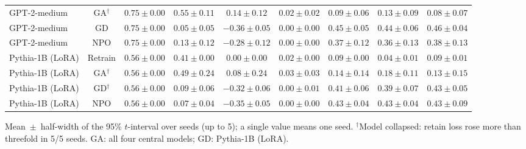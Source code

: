 \begin{table}[t]
\begin{tabular*}{\textwidth}{@{\extracolsep{\fill}}lcccccccc@{}}
GPT-2-medium & GA$^{\dagger}$ & $0.75 \pm 0.00$ & $0.55 \pm 0.11$ & $0.14 \pm 0.12$ & $0.02 \pm 0.02$ & $0.09 \pm 0.06$ & $0.13 \pm 0.09$ & $0.08 \pm 0.07$ \\
GPT-2-medium & GD & $0.75 \pm 0.00$ & $0.05 \pm 0.05$ & $-0.36 \pm 0.05$ & $0.00 \pm 0.00$ & $0.45 \pm 0.05$ & $0.44 \pm 0.06$ & $0.46 \pm 0.04$ \\
GPT-2-medium & NPO & $0.75 \pm 0.00$ & $0.13 \pm 0.12$ & $-0.28 \pm 0.12$ & $0.00 \pm 0.00$ & $0.37 \pm 0.12$ & $0.36 \pm 0.13$ & $0.38 \pm 0.13$ \\
Pythia-1B (LoRA) & Retrain & $0.56 \pm 0.00$ & $0.41 \pm 0.00$ & $0.00 \pm 0.00$ & $0.02 \pm 0.00$ & $0.09 \pm 0.00$ & $0.04 \pm 0.01$ & $0.09 \pm 0.01$ \\
Pythia-1B (LoRA) & GA$^{\dagger}$ & $0.56 \pm 0.00$ & $0.49 \pm 0.24$ & $0.08 \pm 0.24$ & $0.03 \pm 0.03$ & $0.14 \pm 0.14$ & $0.18 \pm 0.11$ & $0.13 \pm 0.15$ \\
Pythia-1B (LoRA) & GD$^{\dagger}$ & $0.56 \pm 0.00$ & $0.09 \pm 0.06$ & $-0.32 \pm 0.06$ & $0.00 \pm 0.01$ & $0.41 \pm 0.06$ & $0.39 \pm 0.07$ & $0.43 \pm 0.05$ \\
Pythia-1B (LoRA) & NPO & $0.56 \pm 0.00$ & $0.07 \pm 0.04$ & $-0.35 \pm 0.05$ & $0.00 \pm 0.00$ & $0.43 \pm 0.04$ & $0.43 \pm 0.04$ & $0.43 \pm 0.09$ \\
\bottomrule
\end{tabular*}

\smallskip
{\footnotesize Mean~$\pm$~half-width of the 95\% $t$-interval over seeds (up to 5); a single value means one seed. $^{\dagger}$Model collapsed: retain loss rose more than threefold in 5/5 seeds. GA: all four central models; GD: Pythia-1B (LoRA).\par}
\end{table}
